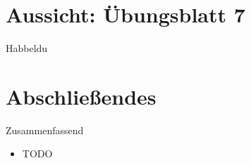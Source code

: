 \iffull
{}
\section{Aussicht: Übungsblatt 7}
\begin{frame}{Habbeldu}
\end{frame}
\fi

\section{Abschließendes}
{\SummaryFrame
\begin{frame}[t]{Zusammenfassend}
\pause \printBibCommand
\vfill\vfill %
\begin{itemize}[<+(1)->]
    \itemsep5pt
    \item TODO
\end{itemize}
\end{frame}
}




\iffull\fi
